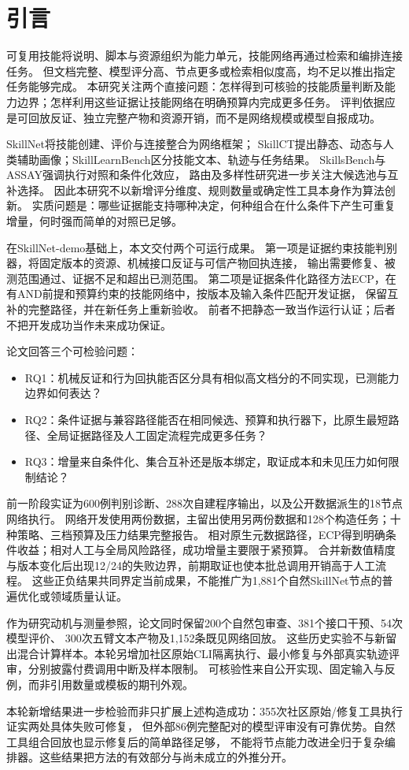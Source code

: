 \section{引言}
可复用技能将说明、脚本与资源组织为能力单元，技能网络再通过检索和编排连接任务。
但文档完整、模型评分高、节点更多或检索相似度高，均不足以推出指定任务能够完成。
本研究关注两个直接问题：怎样得到可核验的技能质量判断及能力边界；怎样利用这些证据让技能网络在明确预算内完成更多任务。
评判依据应是可回放反证、独立完整产物和资源开销，而不是网络规模或模型自报成功。

SkillNet将技能创建、评价与连接整合为网络框架\citep{P01}；
SkillCT提出静态、动态与人类辅助画像\citep{P43}；SkillLearnBench区分技能文本、轨迹与任务结果\citep{P44}。
SkillsBench与ASSAY强调执行对照和条件化效应\citep{P02,P03}，
路由及多样性研究进一步关注大候选池与互补选择\citep{P04,P05}。
因此本研究不以新增评分维度、规则数量或确定性工具本身作为算法创新。
实质问题是：哪些证据能支持哪种决定，何种组合在什么条件下产生可重复增量，何时强而简单的对照已足够。

在SkillNet-demo基础上，本文交付两个可运行成果。
第一项是证据约束技能判别器，将固定版本的资源、机械接口反证与可信产物回执连接，
输出需要修复、被测范围通过、证据不足和超出已测范围。
第二项是证据条件化路径方法ECP，在有AND前提和预算约束的技能网络中，按版本及输入条件匹配开发证据，
保留互补的完整路径，并在新任务上重新验收。
前者不把静态一致当作运行认证；后者不把开发成功当作未来成功保证。

论文回答三个可检验问题：
\begin{itemize}
\item RQ1：机械反证和行为回执能否区分具有相似高文档分的不同实现，已测能力边界如何表达？
\item RQ2：条件证据与兼容路径能否在相同候选、预算和执行器下，比原生最短路径、全局证据路径及人工固定流程完成更多任务？
\item RQ3：增量来自条件化、集合互补还是版本绑定，取证成本和未见压力如何限制结论？
\end{itemize}

前一阶段实证为600例判别诊断、288次自建程序输出，以及公开数据派生的18节点网络执行。
网络开发使用两份数据，主留出使用另两份数据和128个构造任务；十种策略、三档预算及压力结果完整报告。
相对原生元数据路径，ECP得到明确条件收益；相对人工与全局风险路径，成功增量主要限于紧预算。
合并新数值精度与版本变化后出现12/24的失败边界，前期取证也使本批总调用开销高于人工流程。
这些正负结果共同界定当前成果，不能推广为1,881个自然SkillNet节点的普遍优化或领域质量认证。

作为研究动机与测量参照，论文同时保留200个自然包审查、381个接口干预、54次模型评价、
300次五臂文本产物及1,152条既见网络回放。
这些历史实验不与新留出混合计算样本。本轮另增加社区原始CLI隔离执行、最小修复与外部真实轨迹评审，分别披露付费调用中断及样本限制。
可核验性来自公开实现、固定输入与反例，而非引用数量或模板的期刊外观。

本轮新增结果进一步检验而非只扩展上述构造成功：355次社区原始/修复工具执行证实两处具体失败可修复，
但外部86例完整配对的模型评审没有可靠优势。自然工具组合回放也显示修复后的简单路径足够，
不能将节点能力改进全归于复杂编排器。这些结果把方法的有效部分与尚未成立的外推分开。
